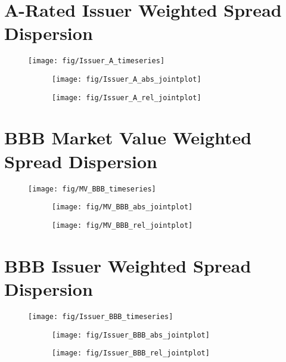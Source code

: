 \documentclass[12pt]{article}
\begin{document}
\section{A-Rated Issuer Weighted Spread Dispersion}
\begin{figure}[H]
	\centering
	\texttt{[image: fig/Issuer\_A\_timeseries]}
\end{figure}
\begin{figure}[H]
	\begin{subfigure}[t]{0.48\textwidth}
		\centering
		\texttt{[image: fig/Issuer\_A\_abs\_jointplot]}
	\end{subfigure}
	\hfill
	\begin{subfigure}[t]{0.48\textwidth}
		\centering
		\texttt{[image: fig/Issuer\_A\_rel\_jointplot]}
	\end{subfigure}
\end{figure}
\pagebreak

\section{BBB Market Value Weighted Spread Dispersion}
\begin{figure}[H]
	\centering
	\texttt{[image: fig/MV\_BBB\_timeseries]}
\end{figure}
\begin{figure}[H]
	\begin{subfigure}[t]{0.48\textwidth}
		\centering
		\texttt{[image: fig/MV\_BBB\_abs\_jointplot]}
	\end{subfigure}
	\hfill
	\begin{subfigure}[t]{0.48\textwidth}
		\centering
		\texttt{[image: fig/MV\_BBB\_rel\_jointplot]}
	\end{subfigure}
\end{figure}
\pagebreak

\section{BBB Issuer Weighted Spread Dispersion}
\begin{figure}[H]
	\centering
	\texttt{[image: fig/Issuer\_BBB\_timeseries]}
\end{figure}
\begin{figure}[H]
	\begin{subfigure}[t]{0.48\textwidth}
		\centering
		\texttt{[image: fig/Issuer\_BBB\_abs\_jointplot]}
	\end{subfigure}
	\hfill
	\begin{subfigure}[t]{0.48\textwidth}
		\centering
		\texttt{[image: fig/Issuer\_BBB\_rel\_jointplot]}
	\end{subfigure}
\end{figure}
\pagebreak
\end{document}
